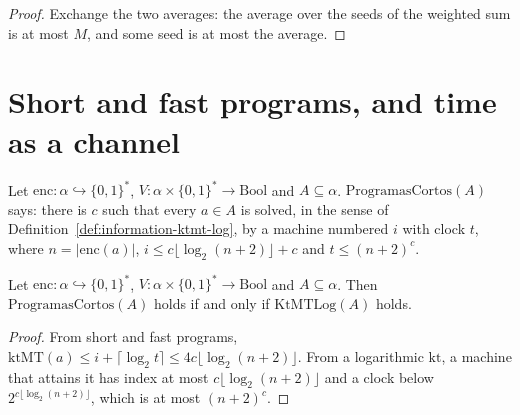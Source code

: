 \begin{proof}
  \leanok
  Exchange the two averages: the average over the seeds of the weighted sum is at most $M$, and
  some seed is at most the average.
\end{proof}

\section{Short and fast programs, and time as a channel}
\label{sec:information-time-channel}

\begin{definition}
  \label{def:information-short-fast}
  \leanok
  Let $\mathrm{enc} : \alpha \hookrightarrow \{0,1\}^*$, $V : \alpha \times \{0,1\}^* \to
  \mathrm{Bool}$ and $A \subseteq \alpha$. $\mathrm{ProgramasCortos}(A)$ says: there is $c$ such that
  every $a \in A$ is solved, in the sense of Definition~\ref{def:information-ktmt-log}, by a machine
  numbered $i$ with clock $t$, where $n = |\mathrm{enc}(a)|$, $i \le c \lfloor \log_2 (n + 2)
  \rfloor + c$ and $t \le (n + 2)^c$.
  \own{}
\end{definition}

\begin{theorem}
  \label{thm:information-short-iff-kt}
  \leanok
  Let $\mathrm{enc} : \alpha \hookrightarrow \{0,1\}^*$, $V : \alpha \times \{0,1\}^* \to
  \mathrm{Bool}$ and $A \subseteq \alpha$. Then $\mathrm{ProgramasCortos}(A)$ holds if and only if
  $\mathrm{KtMTLog}(A)$ holds.
  \own{}
\end{theorem}

\begin{proof}
  \leanok
  From short and fast programs, $\mathrm{ktMT}(a) \le i + \lceil \log_2 t \rceil \le 4c \lfloor
  \log_2 (n+2) \rfloor$. From a logarithmic $\mathrm{kt}$, a machine that attains it has index at
  most $c \lfloor \log_2 (n+2) \rfloor$ and a clock below $2^{c \lfloor \log_2 (n+2) \rfloor}$,
  which is at most $(n+2)^c$.
\end{proof}

